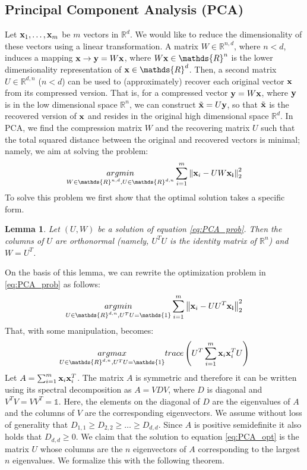 \documentclass[12pt]{report}
\theoremstyle{plain}
\newtheorem{lemma}{Lemma}[chapter]
\begin{document}
\begin{flushleft}
\section{Principal Component Analysis (PCA)}
Let $\vb{x}_1,\dots,\vb{x}_m$ be $m$ vectors in $\mathds{R}^d$. We would like to reduce the dimensionality of these vectors using a linear transformation. A matrix $W\in\mathds{R}^{n,d}$, where $n < d$, induces a mapping $\vb{x}\to\vb{y}=W\vb{x}$, where $W\vb{x}\in\mathds{R}^n$ is the lower dimensionality representation of $\vb{x}\in\mathds{R}^d$. Then, a second matrix $U\in\mathds{R}^{d,n}$ ($n<d$) can be used to (approximately) recover each original vector $\vb{x}$ from its compressed version. That is, for a compressed vector $\vb{y}=W\vb{x}$, where $\vb{y}$ is in the low dimensional space $\mathds{R}^n$, we can construct $\tilde{\vb{x}}=U\vb{y}$, so that $\tilde{\vb{x}}$ is the
recovered version of $\vb{x}$ and resides in the original high dimensional space $\mathds{R}^d$. In PCA, we find the compression matrix $W$ and the recovering matrix $U$ such that the total squared distance between the original and recovered vectors is minimal;
namely, we aim at solving the problem:
\begin{equation}
\underset{W\in\mathds{R}^{n,d},U\in\mathds{R}^{d,n}}{argmin}\sum_{i=1}^m\norm{\vb{x}_i-UW\vb{x_i}}^2_2 
\label{eq:PCA_prob}
\end{equation} 
To solve this problem we first show that the optimal solution takes a specific
form.
\begin{lemma}
	Let $(U,W)$ be a solution of equation \ref{eq:PCA_prob}. Then the columns of $U$ are orthonormal (namely, $U^TU$ is the identity matrix of $\mathds{R}^n$) and $W=U^T$.
\end{lemma}
On the basis of this lemma, we can rewrite the optimization problem in \ref{eq:PCA_prob} as follows:
\[ \underset{U\in\mathds{R}^{d,n},U^TU=\mathds{1}}{argmin}\sum_{i=1}^m\norm{\vb{x}_i-UU^T\vb{x_i}}^2_2 \]
That, with some manipulation, becomes:
\begin{equation}
\underset{U\in\mathds{R}^{d,n},U^TU=\mathds{1}}{argmax}trace\left(U^T\sum_{i=1}^m\vb{x}_i\vb{x}_i^TU\right)
\label{eq:PCA_opt}
\end{equation} 
Let $A=\sum_{i=1}^m\vb{x}_i\vb{x}_i^T$. The matrix $A$ is symmetric and therefore it can be written using its spectral decomposition as $A = VDV$, where $D$ is diagonal and $V^TV =
VV^T = \mathds{1}$. Here, the elements on the diagonal of $D$ are the eigenvalues of $A$ and the columns of $V$ are the corresponding eigenvectors. We assume without loss of generality that $D_{1,1}\geq D_{2,2}\geq \dots\geq D_{d,d}$. Since $A$ is positive semidefinite it also holds that $D_{d,d}\geq 0$. We claim that the solution to equation \ref{eq:PCA_opt} is the matrix $U$ whose columns are the $n$ eigenvectors of $A$ corresponding to the largest $n$ eigenvalues. We formalize this with the following theorem.

\end{flushleft}
\end{document}
